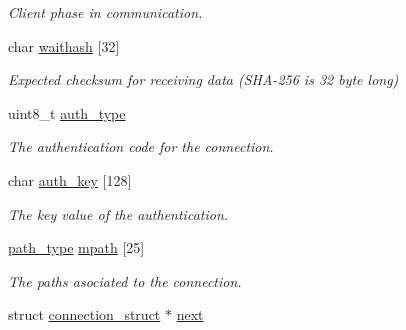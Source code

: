 \begin{DoxyCompactItemize}
\begin{DoxyCompactList}\small\item\em Client phase in communication. \end{DoxyCompactList}\item 
\hypertarget{structconnection__struct_a8f3cc519241e26f13012479a6303003d}{char \hyperlink{structconnection__struct_a8f3cc519241e26f13012479a6303003d}{waithash} \mbox{[}32\mbox{]}}\label{structconnection__struct_a8f3cc519241e26f13012479a6303003d}

\begin{DoxyCompactList}\small\item\em Expected checksum for receiving data (S\-H\-A-\/256 is 32 byte long) \end{DoxyCompactList}\item 
\hypertarget{structconnection__struct_ac853d80a4be84d57cd987b407436a090}{uint8\-\_\-t \hyperlink{structconnection__struct_ac853d80a4be84d57cd987b407436a090}{auth\-\_\-type}}\label{structconnection__struct_ac853d80a4be84d57cd987b407436a090}

\begin{DoxyCompactList}\small\item\em The authentication code for the connection. \end{DoxyCompactList}\item 
\hypertarget{structconnection__struct_abb37117968e1e455bb64438b70f0dd55}{char \hyperlink{structconnection__struct_abb37117968e1e455bb64438b70f0dd55}{auth\-\_\-key} \mbox{[}128\mbox{]}}\label{structconnection__struct_abb37117968e1e455bb64438b70f0dd55}

\begin{DoxyCompactList}\small\item\em The key value of the authentication. \end{DoxyCompactList}\item 
\hypertarget{structconnection__struct_a6ac77a9314561e674aecd002560400b7}{\hyperlink{multipath_8h_aeef42a0780e3248ffc87c4dfa7d30213}{path\-\_\-type} \hyperlink{structconnection__struct_a6ac77a9314561e674aecd002560400b7}{mpath} \mbox{[}25\mbox{]}}\label{structconnection__struct_a6ac77a9314561e674aecd002560400b7}

\begin{DoxyCompactList}\small\item\em The paths asociated to the connection. \end{DoxyCompactList}\item 
\hypertarget{structconnection__struct_a5fc9f87b7e6d9f85c81cd39a8349078d}{struct \hyperlink{structconnection__struct}{connection\-\_\-struct} $\ast$ \hyperlink{structconnection__struct_a5fc9f87b7e6d9f85c81cd39a8349078d}{next}}\label{structconnection__struct_a5fc9f87b7e6d9f85c81cd39a8349078d}


\end{DoxyCompactItemize}

